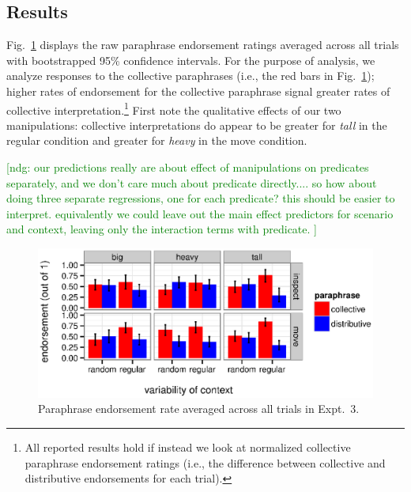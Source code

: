 \documentclass[linguex]{sp}
\newcommand{\ndg}[1]{\textcolor{Green}{[ndg: #1]}}
\begin{document}
\subsection{Results}

Fig.\ \ref{resultsexpt2} displays the raw paraphrase endorsement ratings averaged across all trials with bootstrapped 95\% confidence intervals. For the purpose of analysis, we analyze responses to the collective paraphrases (i.e., the red bars in Fig.~\ref{resultsexpt2}); higher rates of endorsement for the collective paraphrase signal greater rates of collective interpretation.\footnote{All reported results hold if instead we look at normalized collective paraphrase endorsement ratings (i.e., the difference between collective and distributive endorsements for each trial).} %
First note the qualitative effects of our two manipulations: collective interpretations do appear to be greater for \emph{tall} in the regular condition and greater for \emph{heavy} in the move condition.

\ndg{our predictions really are about effect of manipulations on predicates separately, and we don't care much about predicate directly.... so how about doing three separate regressions, one for each predicate? this should be easier to interpret. equivalently we could leave out the main effect predictors for scenario and context, leaving only the interaction terms with predicate. }

\begin{figure}[h!]
	\centering
	\includegraphics[width=\linewidth]{plots/expt2rawbootsci2.eps} 
	\vspace{-15pt}
	\caption{Paraphrase endorsement rate averaged across all trials in Expt.~3.}\label{resultsexpt2}
\end{figure}
\end{document}
